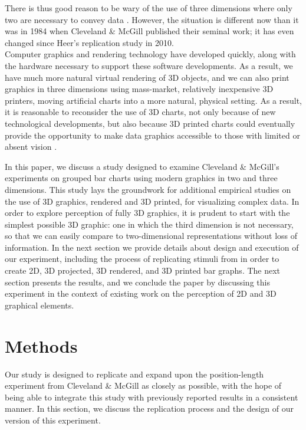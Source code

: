 \documentclass[letterpaper,inpress,dvipsnames]{jdsart}
\begin{document}
There is thus good reason to be wary of the use of three dimensions where only two are necessary to convey data \citep{huffHowLieStatistics1954}.
However, the situation is different now than it was in 1984 when Cleveland \& McGill published their seminal work; it has even changed since Heer's replication study \citeyearpar{heerCrowdsourcingGraphicalPerception2010b} in 2010.\\
Computer graphics and rendering technology have developed quickly, along with the hardware necessary to support these software developments.
As a result, we have much more natural virtual rendering of 3D objects, and we can also print graphics in three dimensions using mass-market, relatively inexpensive 3D printers, moving artificial charts into a more natural, physical setting.
As a result, it is reasonable to reconsider the use of 3D charts, not only because of new technological developments, but also because 3D printed charts could eventually provide the opportunity to make data graphics accessible to those with limited or absent vision \citep{fleetHowTactileGraphics2023}.

In this paper, we discuss a study designed to examine Cleveland \& McGill's experiments on grouped bar charts using modern graphics in two and three dimensions. This study lays the groundwork for additional empirical studies on the use of 3D graphics, rendered and 3D printed, for visualizing complex data. In order to explore perception of fully 3D graphics, it is prudent to start with the simplest possible 3D graphic: one in which the third dimension is not necessary, so that we can easily compare to two-dimensional representations without loss of information.
In the next section we provide details about design and execution of our experiment, including the process of replicating stimuli from \citet{clevelandGraphical1984} in order to create 2D, 3D projected, 3D rendered, and 3D printed bar graphs. The next section presents the results, and we conclude the paper by discussing this experiment in the context of existing work on the perception of 2D and 3D graphical elements.

\hypertarget{methods}{%
\section{Methods}\label{methods}}

Our study is designed to replicate and expand upon the position-length experiment from Cleveland \& McGill as closely as possible, with the hope of being able to integrate this study with previously reported results in a consistent manner.
In this section, we discuss the replication process and the design of our version of this experiment.
\end{document}
